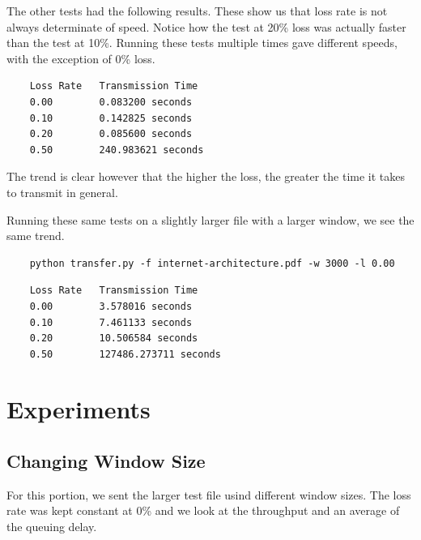 \documentclass[11pt]{article}
\begin{document}
The other tests had the following results. These show us that loss rate is not always determinate of speed. Notice how the test at 20\% loss was actually faster than the test at 10\%. Running these tests multiple times gave different speeds, with the exception of 0\% loss.

\vspace{5mm}

\begin{lstlisting}
    Loss Rate   Transmission Time
    0.00        0.083200 seconds
    0.10        0.142825 seconds
    0.20        0.085600 seconds
    0.50        240.983621 seconds
\end{lstlisting}

\vspace{5mm}

The trend is clear however that the higher the loss, the greater the time it takes to transmit in general.

\vspace{5mm}

Running these same tests on a slightly larger file with a larger window, we see the same trend.

\vspace{5mm}

\begin{lstlisting}
    python transfer.py -f internet-architecture.pdf -w 3000 -l 0.00
\end{lstlisting}

\vspace{5mm}

\begin{lstlisting}
    Loss Rate   Transmission Time
    0.00        3.578016 seconds
    0.10        7.461133 seconds
    0.20        10.506584 seconds
    0.50        127486.273711 seconds
\end{lstlisting}

\vspace{5mm}

\section{Experiments}

\subsection{Changing Window Size}

For this portion, we sent the larger test file usind different window sizes. The loss rate was kept constant at 0\% and we look at  the throughput and an average of the queuing delay.
\end{document}
